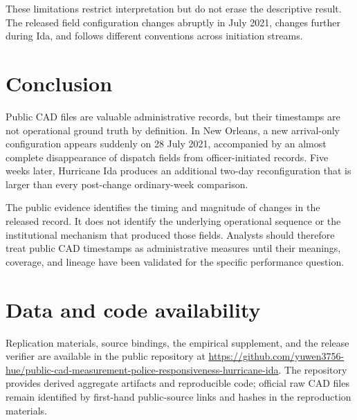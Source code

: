 \documentclass[11pt]{article}
\begin{document}
These limitations restrict interpretation but do not erase the descriptive result. The released field configuration changes abruptly in July 2021, changes further during Ida, and follows different conventions across initiation streams.

\section{Conclusion}

Public CAD files are valuable administrative records, but their timestamps are not operational ground truth by definition. In New Orleans, a new arrival-only configuration appears suddenly on 28 July 2021, accompanied by an almost complete disappearance of dispatch fields from officer-initiated records. Five weeks later, Hurricane Ida produces an additional two-day reconfiguration that is larger than every post-change ordinary-week comparison.

The public evidence identifies the timing and magnitude of changes in the released record. It does not identify the underlying operational sequence or the institutional mechanism that produced those fields. Analysts should therefore treat public CAD timestamps as administrative measures until their meanings, coverage, and lineage have been validated for the specific performance question.

\section*{Data and code availability}

Replication materials, source bindings, the empirical supplement, and the release verifier are available in the public repository at \url{https://github.com/yuwen3756-hue/public-cad-measurement-police-responsiveness-hurricane-ida}. The repository provides derived aggregate artifacts and reproducible code; official raw CAD files remain identified by first-hand public-source links and hashes in the reproduction materials.



\end{document}
